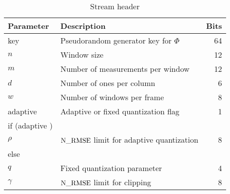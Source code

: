 \begin{table}[ht]
\footnotesize
\centering
\caption{Stream header}
\begin{tabular}{llr}
\toprule
Parameter & Description & Bits \\
\midrule 
key & Pseudorandom generator key for $\Phi$ & 64 \\
$n$ & Window size & 12 \\
$m$ & Number of measurements per window & 12 \\
$d$ & Number of ones per column & 6 \\
$w$ & Number of windows per frame & 8 \\
adaptive & Adaptive or fixed quantization flag & 1 \\
if (adaptive ) &  \\
\hspace{1cm} $\rho$ & $\mathrm{N\_RMSE}$ limit for adaptive quantization & 8 \\
else & \\
\hspace{1cm} $q$ & Fixed quantization parameter & 4 \\
$\gamma$ & $\mathrm{N\_RMSE}$ limit for clipping & 8 \\
\bottomrule
\end{tabular}
\label{tbl:header:stream}
\end{table}
